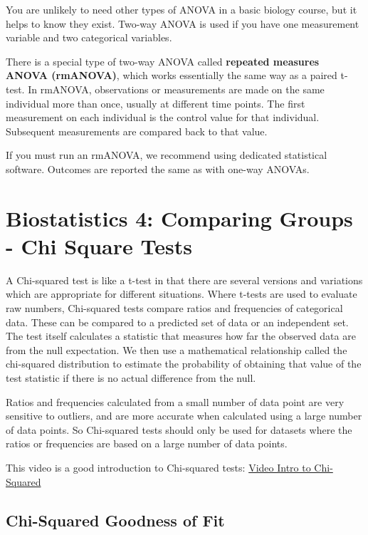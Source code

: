 \documentclass[
]{book}
\begin{document}
You are unlikely to need other types of ANOVA in a basic biology course, but it helps to know they exist. Two-way ANOVA is used if you have one measurement variable and two categorical variables.

There is a special type of two-way ANOVA called \textbf{repeated measures ANOVA (rmANOVA)}, which works essentially the same way as a paired t-test. In rmANOVA, observations or measurements are made on the same individual more than once, usually at different time points. The first measurement on each individual is the control value for that individual. Subsequent measurements are compared back to that value.

If you must run an rmANOVA, we recommend using dedicated statistical software. Outcomes are reported the same as with one-way ANOVAs.

\hypertarget{compstatsthree475}{%
\chapter{Biostatistics 4: Comparing Groups - Chi Square Tests}\label{compstatsthree475}}

A Chi-squared test is like a t-test in that there are several versions and variations which are appropriate for different situations. Where t-tests are used to evaluate raw numbers, Chi-squared tests compare ratios and frequencies of categorical data. These can be compared to a predicted set of data or an independent set. The test itself calculates a statistic that measures how far the observed data are from the null expectation. We then use a mathematical relationship called the chi-squared distribution to estimate the probability of obtaining that value of the test statistic if there is no actual difference from the null.

Ratios and frequencies calculated from a small number of data point are very sensitive to outliers, and are more accurate when calculated using a large number of data points. So Chi-squared tests should only be used for datasets where the ratios or frequencies are based on a large number of data points.

This video is a good introduction to Chi-squared tests: \href{https://youtu.be/7_cs1YlZoug}{Video Intro to Chi-Squared}

\hypertarget{chi-squared-goodness-of-fit}{%
\section{Chi-Squared Goodness of Fit}\label{chi-squared-goodness-of-fit}}
\end{document}
